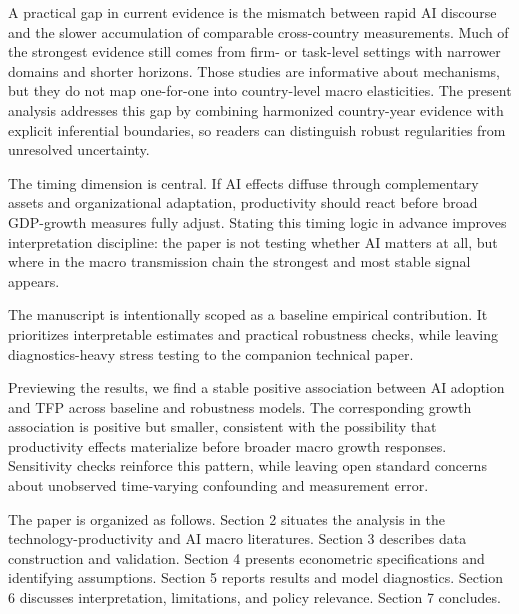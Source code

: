 A practical gap in current evidence is the mismatch between rapid AI discourse and the slower accumulation of comparable cross-country measurements. Much of the strongest evidence still comes from firm- or task-level settings with narrower domains and shorter horizons. Those studies are informative about mechanisms, but they do not map one-for-one into country-level macro elasticities. The present analysis addresses this gap by combining harmonized country-year evidence with explicit inferential boundaries, so readers can distinguish robust regularities from unresolved uncertainty.

The timing dimension is central. If AI effects diffuse through complementary assets and organizational adaptation, productivity should react before broad GDP-growth measures fully adjust. Stating this timing logic in advance improves interpretation discipline: the paper is not testing whether AI matters at all, but where in the macro transmission chain the strongest and most stable signal appears.

The manuscript is intentionally scoped as a baseline empirical contribution. It prioritizes interpretable estimates and practical robustness checks, while leaving diagnostics-heavy stress testing to the companion technical paper.

Previewing the results, we find a stable positive association between AI adoption and TFP across baseline and robustness models. The corresponding growth association is positive but smaller, consistent with the possibility that productivity effects materialize before broader macro growth responses. Sensitivity checks reinforce this pattern, while leaving open standard concerns about unobserved time-varying confounding and measurement error.

The paper is organized as follows. Section 2 situates the analysis in the technology-productivity and AI macro literatures. Section 3 describes data construction and validation. Section 4 presents econometric specifications and identifying assumptions. Section 5 reports results and model diagnostics. Section 6 discusses interpretation, limitations, and policy relevance. Section 7 concludes.
